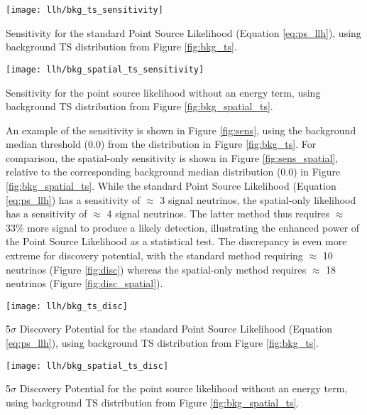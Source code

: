\begin{marginfigure}
	\centering \texttt{[image: llh/bkg\_ts\_sensitivity]}
	\caption{Sensitivity for the standard Point Source Likelihood (Equation \ref{eq:ps_llh}),  using background TS distribution from Figure \ref{fig:bkg_ts}.}
	\label{fig:sens}
\end{marginfigure}

\begin{marginfigure}
	\centering \texttt{[image: llh/bkg\_spatial\_ts\_sensitivity]}
	\caption{Sensitivity for the point source likelihood without an energy term, using background TS distribution from Figure \ref{fig:bkg_spatial_ts}.}
	\label{fig:sens_spatial}
\end{marginfigure}

An example of the sensitivity is shown in Figure \ref{fig:sens}, using the background median threshold (0.0)  from the distribution in Figure \ref{fig:bkg_ts}. For comparison, the spatial-only sensitivity is shown in Figure \ref{fig:sens_spatial}, relative to the corresponding background median distribution (0.0) in Figure \ref{fig:bkg_spatial_ts}. While the standard Point Source Likelihood (Equation \ref{eq:ps_llh}) has a sensitivity of $\approx$ 3 signal neutrinos, the spatial-only likelihood has a sensitivity of $\approx$ 4 signal neutrinos. The latter method thus requires $\approx$ 33\% more signal to produce a likely detection, illustrating the enhanced power of the Point Source Likelihood as a statistical test. The discrepancy is even more extreme for discovery potential, with the standard method requiring $\approx$ 10 neutrinos (Figure \ref{fig:disc}) whereas the spatial-only method requires $\approx$ 18 neutrinos (Figure \ref{fig:disc_spatial}).

\begin{marginfigure}
	\centering \texttt{[image: llh/bkg\_ts\_disc]}
	\caption{5$\sigma$ Discovery Potential for the standard Point Source Likelihood (Equation \ref{eq:ps_llh}), using background TS distribution from Figure \ref{fig:bkg_ts}.}
	\label{fig:disc}
\end{marginfigure}

\begin{marginfigure}
	\centering \texttt{[image: llh/bkg\_spatial\_ts\_disc]}
	\caption{5$\sigma$ Discovery Potential for the point source likelihood without an energy term, using background TS distribution from Figure \ref{fig:bkg_spatial_ts}.}
	\label{fig:disc_spatial}
\end{marginfigure}

